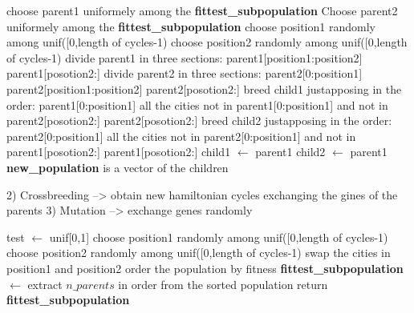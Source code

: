 \documentclass{article}
\begin{document}
\begin{algorithm}
    \begin{algorithmic}[1]
  			\State choose parent1 uniformely among the \textbf{fittest\_subpopulation}
  			\State Choose parent2 uniformely among the \textbf{fittest\_subpopulation}
  				\State choose position1 randomly among unif([0,length of cycles-1)
  				\State choose position2 randomly among unif([0,length of cycles-1)
  				\State divide parent1 in three sections: 
  				\State parent1[position1:position2]
  				\State parent1[posotion2:]
  				\State divide parent2 in three sections:
  				\State parent2[0:position1] 
  				\State parent2[position1:position2]
  				\State parent2[posotion2:]
  				\State breed child1 justapposing in the order:
  				\State parent1[0:position1]
  				\State all the cities not in  parent1[0:position1] and not in parent2[posotion2:]
  				\State parent2[posotion2:]
  				\State breed child2 justapposing in the order:
  				\State parent2[0:position1]
  				\State all the cities not in  parent2[0:position1] and not in parent1[posotion2:]
  				\State parent1[posotion2:]
  			\Else
  				\State child1 $\leftarrow$ parent1
  				\State child2 $\leftarrow$ parent1
  			\EndIf
      	\EndFor
        \State \textbf{new\_population} is a vector of the children 
       \EndFunction
\end{algorithmic}
\end{algorithm}
2) Crossbreeding --> obtain new hamiltonian cycles exchanging the gines of the parents
3) Mutation --> exchange genes randomly
\begin{algorithm}[h]
    \begin{algorithmic}[1]
        \State test $\leftarrow$ unif[0,1]
        	\State choose position1 randomly among unif([0,length of cycles-1)
  			\State choose position2 randomly among unif([0,length of cycles-1)
  			\State swap the cities in position1 and position2
        \EndIf
        \State order the population by fitness
        \State \textbf{fittest\_subpopulation} $\leftarrow$ extract $n\_parents$ in order from the sorted population
        \State return \textbf{fittest\_subpopulation}
       \EndFunction
\end{algorithmic}
\end{algorithm}
\end{document}
